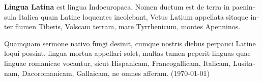 \documentclass[a4paper]{article}
\begin{document}
\begin{latin}
\textbf{Lingua Latina} est lingua Indoeuropaea. Nomen ductum est de terra in paeninsula Italica quam Latine loquentes incolebant, Vetus Latium appellata sitaque inter flumen Tiberis, Volscam terram, mare Tyrrhenicum, montes Apenninos.

Quamquam sermone nativo fungi desinit, cumque nostris diebus perpauci Latine loqui possint, lingua mortua appellari solet, multas tamen peperit linguas quae linguae romanicae vocantur, sicut Hispanicam, Francogallicam, Italicam, Lusitanam, Dacoromanicam, Gallaicam, ne omnes afferam.
(\today) 

%
\end{latin}
\bigskip
\end{document}
